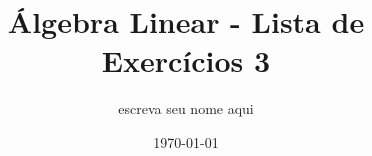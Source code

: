 \documentclass[leqno]{article}
\numberwithin{equation}{section}
\begin{document}
\newtheorem{teo}{Teorema}[section] \newtheorem*{teo*}{Teorema}
\newtheorem{prop}[teo]{Proposição} \newtheorem*{prop*}{Proposição}
\newtheorem{lema}[teo]{Lemma} \newtheorem*{lema*}{Lema}
\newtheorem{cor}[teo]{Corolário} \newtheorem*{cor*}{Corolário}

\theoremstyle{definition}
\newtheorem{defi}[teo]{Definição} \newtheorem*{defi*}{Definição}
\newtheorem{exem}[teo]{Exemplo} \newtheorem*{exem*}{Exemplo}
\newtheorem{obs}[teo]{Observação} \newtheorem*{obs*}{Observação}
\newtheorem*{hipo}{Hipóteses}
\newtheorem*{nota}{Notação}

\newcommand{\ds}{\displaystyle} \newcommand{\nl}{\newline}
\newcommand{\eps}{\varepsilon} \newcommand{\ssty}{\scriptstyle}
\newcommand{\bE}{\mathbb{E}}
\newcommand{\cB}{\mathcal{B}}
\newcommand{\cF}{\mathcal{F}}
\newcommand{\cA}{\mathcal{A}}
\newcommand{\cM}{\mathcal{M}}
\newcommand{\cD}{\mathcal{D}}
\newcommand{\cN}{\mathcal{N}}
\newcommand{\cL}{\mathcal{L}}
\newcommand{\cLN}{\mathcal{LN}}
\newcommand{\bP}{\mathbb{P}}
\newcommand{\bQ}{\mathbb{Q}}
\newcommand{\bN}{\mathbb{N}}
\newcommand{\bR}{\mathbb{R}}
\newcommand{\bZ}{\mathbb{Z}}

\newcommand{\bfw}{\mathbf{w}}
\newcommand{\bfv}{\mathbf{v}}
\newcommand{\bfu}{\mathbf{u}}

\newenvironment{sol}
{
    \vspace{4mm}
    \noindent\textbf{Resolução:}
    \strut\newline
    \smallskip
    \hspace{-3.5mm}
}
{}

\newcommand{\bvecc}[2]{%
  \begin{bmatrix} #1 \\ #2  \end{bmatrix}
}
\newcommand{\bveccc}[3]{%
  \begin{bmatrix} #1 \\ #2 \\ #3  \end{bmatrix}
}


\title{Álgebra Linear - Lista de Exercícios 3}

\author{escreva seu nome aqui}

\date{\today}

\maketitle
\end{document}
